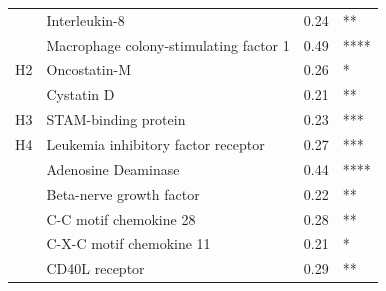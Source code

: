 \begin{table}[ht]
{\begin{tabular}{clll}
                                           & \cellcolor[HTML]{EFEFEF}Interleukin-8                                                 & \cellcolor[HTML]{EFEFEF}0.24       & \cellcolor[HTML]{EFEFEF}**              \\
                                           & Macrophage colony-stimulating factor 1                                                & 0.49                               & ****                                    \\
\multirow{-10}{*}{H2}                      & Oncostatin-M                                                                          & 0.26                               & *                                       \\ \hline
                                           & Cystatin D                                                                            & 0.21                               & **                                      \\
\multirow{-2}{*}{H3}                       & STAM-binding protein                                                                  & 0.23                               & ***                                     \\ \hline
H4                                         & \cellcolor[HTML]{EFEFEF}Leukemia inhibitory factor receptor                           & \cellcolor[HTML]{EFEFEF}0.27       & \cellcolor[HTML]{EFEFEF}***             \\ \hline
                                           & \cellcolor[HTML]{EFEFEF}Adenosine Deaminase                                           & \cellcolor[HTML]{EFEFEF}0.44       & \cellcolor[HTML]{EFEFEF}****            \\
                                           & \cellcolor[HTML]{EFEFEF}Beta-nerve growth factor                                      & \cellcolor[HTML]{EFEFEF}0.22       & \cellcolor[HTML]{EFEFEF}**              \\
                                           & \cellcolor[HTML]{EFEFEF}C-C motif chemokine 28                                        & \cellcolor[HTML]{EFEFEF}0.28       & \cellcolor[HTML]{EFEFEF}**              \\
                                           & C-X-C motif chemokine 11                                                              & 0.21                               & *                                       \\
                                           & CD40L receptor                                                                        & 0.29                               & **                                      \\

\end{tabular}}
\end{table}
